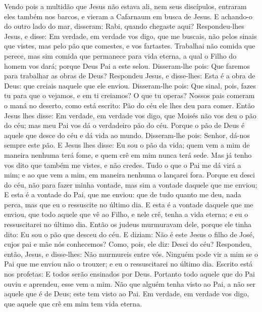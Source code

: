 {  Vendo pois a multidão que Jesus não estava ali, nem seus discípulos, entraram eles também nos barcos, e vieram a Cafarnaum em busca de Jesus.
  E achando-o do outro lado do mar, disseram: Rabi, quando chegaste aqui?
  Respondeu-lhes Jesus, e disse: Em verdade, em verdade vos digo, que me buscais, não pelos sinais que vistes, mas pelo pão que comestes, e vos fartastes.
  Trabalhai não
{} comida que perece, mas sim
{} comida que permanece para vida eterna, a qual o Filho do homem vos dará; porque Deus Pai a este selou.
  Disseram-lhe pois: Que faremos para trabalhar as obras de Deus?
  Respondeu Jesus, e disse-lhes: Esta é a obra de Deus: que creiais naquele que ele enviou.
  Disseram-lhe pois: Que sinal, pois, fazes tu para que o vejamos, e em ti creiamos? O que tu operas?
  Nossos pais comeram o maná no deserto, como está escrito: Pão do céu ele lhes deu para comer.
  Então Jesus lhes disse: Em verdade, em verdade vos digo, que Moisés não vos deu o pão do céu; mas meu Pai vos dá o verdadeiro pão do céu.
  Porque o pão de Deus é aquele que desce do céu e dá vida ao mundo.
  Disseram-lhe pois: Senhor, dá-nos sempre
{} este pão.
  E Jesus lhes disse: Eu sou o pão da vida; quem vem a mim de maneira nenhuma terá fome, e quem crê em mim nunca terá sede.
  Mas já tenho vos dito que também me vistes, e não credes.
  Tudo o que o Pai me dá virá a mim; e ao que vem a mim, em maneira nenhuma o lançarei fora.
  Porque eu desci do céu, não para fazer minha vontade, mas sim a vontade daquele que me enviou;
  E esta é a vontade do Pai, que me enviou: que de tudo quanto me deu, nada perca, mas que eu o ressuscite no último dia.
  E esta é a vontade daquele que me enviou, que todo aquele que vê ao Filho, e nele crê, tenha a vida eterna; e eu o ressuscitarei no último dia.
  Então os judeus murmuravam dele, porque ele tinha dito: Eu sou o pão que desceu do céu.
  E diziam: Não é este Jesus o filho de José, cujos pai e mãe nós conhecemos? Como, pois, ele diz: Desci do céu?
  Respondeu, então, Jesus, e disse-lhes: Não murmureis entre vós.
  Ninguém pode vir a mim se o Pai que me enviou não o trouxer; e eu o ressuscitarei no último dia.
  Escrito está nos profetas: E todos serão ensinados por Deus. Portanto todo aquele que do Pai ouviu e aprendeu, esse vem a mim.
  Não que alguém tenha visto ao Pai, a não ser aquele que é de Deus; este tem visto ao Pai.
  Em verdade, em verdade vos digo, que aquele que crê em mim tem vida eterna.
}
